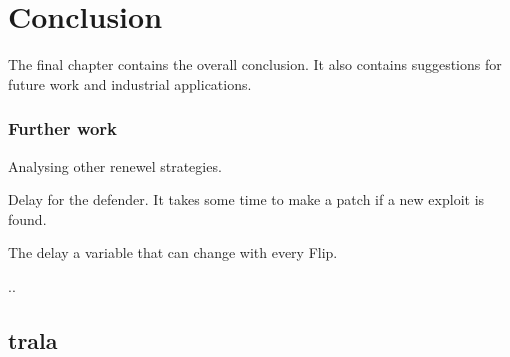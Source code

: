 \chapter{Conclusion}
\label{chapter5:conclusion}
The final chapter contains the overall conclusion. It also contains
suggestions for future work and industrial applications.

\subsection{Further work}

\begin{description}
\item Analysing other renewel strategies.
\item Delay for the defender. It takes some time to make a patch if a new exploit is found.
\item The delay a variable that can change with every Flip.
\item ..
\end{description}

\section{trala}
